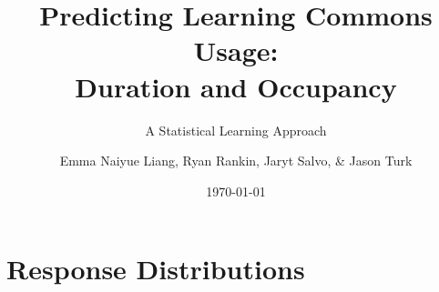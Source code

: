 \documentclass{beamer}
\title{Predicting Learning Commons Usage:\\Duration and Occupancy}
\subtitle{A Statistical Learning Approach}
\author{Emma Naiyue Liang, Ryan Rankin, Jaryt Salvo, \& Jason Turk}
\institute{MATH 7550 Statistical Learning \textbar\textbar \space BGSU}
\date{\today}
\begin{document}
\begin{frame}
\titlepage
\end{frame}

\section{Response Distributions}

            
                
\end{document}
